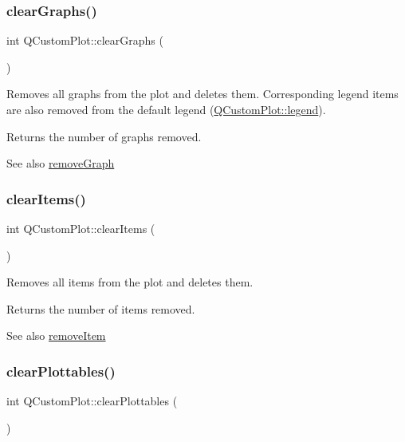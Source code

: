 \subsubsection{\texorpdfstring{clear\+Graphs()}{clearGraphs()}}
{\footnotesize\ttfamily int Q\+Custom\+Plot\+::clear\+Graphs (\begin{DoxyParamCaption}{ }\end{DoxyParamCaption})}

Removes all graphs from the plot and deletes them. Corresponding legend items are also removed from the default legend (\mbox{\hyperlink{class_q_custom_plot_a4eadcd237dc6a09938b68b16877fa6af}{Q\+Custom\+Plot\+::legend}}).

Returns the number of graphs removed.

\begin{DoxySeeAlso}{See also}
\mbox{\hyperlink{class_q_custom_plot_a903561be895fb6528a770d66ac5e6713}{remove\+Graph}} 
\end{DoxySeeAlso}
\mbox{\label{class_q_custom_plot_abdfd07d4f0591d0cf967f85013fd3645}} 
\subsubsection{\texorpdfstring{clear\+Items()}{clearItems()}}
{\footnotesize\ttfamily int Q\+Custom\+Plot\+::clear\+Items (\begin{DoxyParamCaption}{ }\end{DoxyParamCaption})}

Removes all items from the plot and deletes them.

Returns the number of items removed.

\begin{DoxySeeAlso}{See also}
\mbox{\hyperlink{class_q_custom_plot_ae04446557292551e8fb6e2c106e1848d}{remove\+Item}} 
\end{DoxySeeAlso}
\mbox{\label{class_q_custom_plot_a9a409bb3201878adb7ffba1c89c4e004}} 
\subsubsection{\texorpdfstring{clear\+Plottables()}{clearPlottables()}}
{\footnotesize\ttfamily int Q\+Custom\+Plot\+::clear\+Plottables (\begin{DoxyParamCaption}{ }\end{DoxyParamCaption})}

